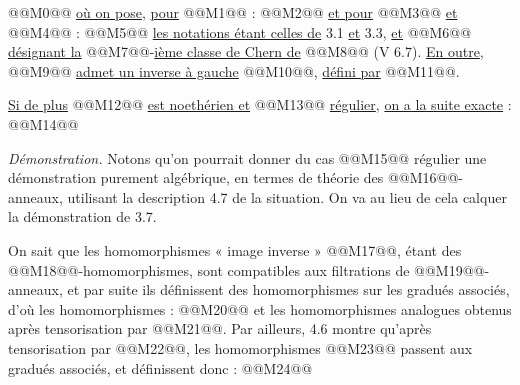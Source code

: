 
@@M0@@
\uline{où on pose}, \uline{pour} @@M1@@ :
@@M2@@
\uline{et pour} @@M3@@ \uline{et} @@M4@@ :
@@M5@@
\uline{les notations étant celles de} 3.1 \uline{et} 3.3, \uline{et} @@M6@@ \uline{désignant la} @@M7@@-\uline{ième classe de Chern de} @@M8@@ (V 6.7). \uline{En outre}, @@M9@@ \uline{admet un inverse à gauche} @@M10@@, \uline{défini par} @@M11@@.

\uline{Si de plus} @@M12@@ \uline{est noethérien et} @@M13@@ \uline{régulier}, \uline{on a la suite exacte} :
@@M14@@

\emph{Démonstration.} Notons qu'on pourrait donner du cas @@M15@@ régulier une démonstration purement algébrique, en termes de théorie des @@M16@@-anneaux, utilisant la description 4.7 de la situation. On va au lieu de cela calquer la démonstration de 3.7.

On sait que les homomorphismes « image inverse » @@M17@@, étant des @@M18@@-homomorphismes, sont compatibles aux filtrations de @@M19@@-anneaux, et par suite ils définissent des homomorphismes sur les gradués associés, d'où les homomorphismes :
@@M20@@
et les homomorphismes analogues obtenus après tensorisation par @@M21@@. Par ailleurs, 4.6 montre qu'après tensorisation par @@M22@@, les homomorphismes @@M23@@ passent aux gradués associés, et définissent
donc :
@@M24@@
